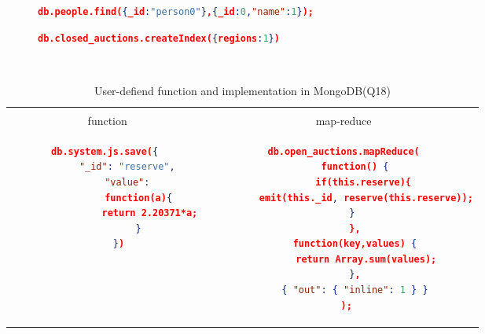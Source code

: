 \begin{figure}
\centering
\begin{lstlisting}[language=JSON, caption=XMark Query Q1 in MongoDB, label=mongo-xmark-q1]
		db.people.find({_id:"person0"},{_id:0,"name":1});
\end{lstlisting}

\centering
\begin{lstlisting}[language=JSON, caption=MongoDB secondary Index, label=mongodb-create-index]
             db.closed_auctions.createIndex({regions:1})
\end{lstlisting}

\begin{lstlisting}[language=JSON, caption=user-defined function in MongoDB, label=mongodb-user-defined-function]
         
\end{lstlisting}
\end{figure}



\begin{longtable}{c|c}
    \hline
	\caption{ User-defiend function and implementation in MongoDB(Q18)}
	\label{tbl:mongodb-q18}\\
    {function } & {map-reduce}\\
	\hline
\begin{minipage}{.4\textwidth}
\begin{lstlisting}[language=JSON,basicstyle =\scriptsize]
    db.system.js.save({ 
        "_id": "reserve", 
        "value": 
            function(a){ 
                return 2.20371*a; 
            } 
    })
\end{lstlisting}
\end{minipage} &
\begin{minipage}{.4\textwidth}
\begin{lstlisting}[language=JSON,basicstyle =\scriptsize]
db.open_auctions.mapReduce(
    function() {
       if(this.reserve){
        emit(this._id, reserve(this.reserve));
       }    
    },
    function(key,values) {
        return Array.sum(values);
    },
    { "out": { "inline": 1 } }
 );
\end{lstlisting}
\end{minipage}
\end{longtable}


